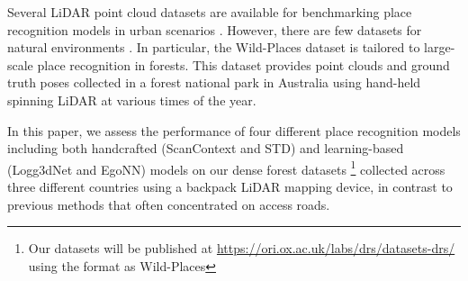 Several LiDAR point cloud datasets are available for benchmarking place recognition models in urban scenarios \cite{maddern2017ijrr, behley2019iccv, kim2020icra}. However, there are few datasets  for natural environments \cite{triest2022icra, knights2023icra}. In particular, the Wild-Places dataset \cite{knights2023icra} is tailored to large-scale place recognition in forests. This dataset provides point clouds and ground truth poses collected in a forest national park in Australia using hand-held spinning LiDAR at various times of the year.

In this paper, we assess the performance of four different place recognition models including both handcrafted (ScanContext and STD) and learning-based (Logg3dNet and EgoNN) models on our dense forest datasets \footnote{Our datasets will be published at \url{https://ori.ox.ac.uk/labs/drs/datasets-drs/} using the format as Wild-Places} collected across three different countries using a backpack LiDAR mapping device, in contrast to previous methods that often concentrated on access roads. 

